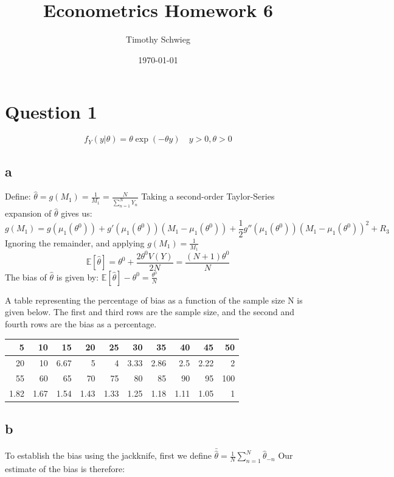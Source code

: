 \documentclass[11pt]{article}
\author{Timothy Schwieg}
\date{\today}
\title{Econometrics Homework 6}
\begin{document}
\maketitle


\section{Question 1}
\label{sec-1}
$$f_Y(y|\theta) = \theta \exp( - \theta y ) \quad y > 0, \theta > 0$$
\subsection{a}
\label{sec-1-1}
Define:
$\hat{\theta} = g(M_1) = \frac{1}{M_1} = \frac{ N }{ \sum_{n=1}^N Y_n }$
Taking a second-order Taylor-Series expansion of $\hat{\theta}$ gives us:
$$g(M_1) = g( \mu_1(\theta^0) ) + g'(\mu_1(\theta^0))( M_1 - \mu_1(\theta^0) ) + \frac{1}{2}g''( \mu_1(\theta^0) )(M_1 - \mu_1(\theta^0) )^2 + R_3$$
Ignoring the remainder, and applying $g(M_1) = \frac{1}{M_1}$
$$\mathbb{E}[\hat{\theta}] = \theta^0 + \frac{2 \theta^0 V(Y)}{2N} = \frac{(N+1)\theta^0}{N}$$
The bias of $\hat{\theta}$ is given by:
$\mathbb{E}[\hat{\theta}] - \theta^0 = \frac{\theta^0}{N}$

A table representing the percentage of bias as a function of the
sample size N is given below. The first and third rows are the sample
size, and the second and fourth rows are the bias as a percentage.

\begin{center}
\begin{tabular}{|r|r|r|r|r|r|r|r|r|r|}\hline
5 & 10 & 15 & 20 & 25 & 30 & 35 & 40 & 45 & 50\\\hline
20 & 10 & 6.67 & 5 & 4 & 3.33 & 2.86 & 2.5 & 2.22 & 2\\\hline
55 & 60 & 65 & 70 & 75 & 80 & 85 & 90 & 95 & 100\\\hline
1.82 & 1.67 & 1.54 & 1.43 & 1.33 & 1.25 & 1.18 & 1.11 & 1.05 & 1\\\hline
\end{tabular}
\end{center}

\subsection{b}
\label{sec-1-2}

To establish the bias using the jackknife, first we define $\bar{
\hat{ \theta } } = \frac{1}{N} \sum_{n=1}^N \hat{ \theta}_{-n}$ Our estimate of the bias
is therefore: 
\end{document}
